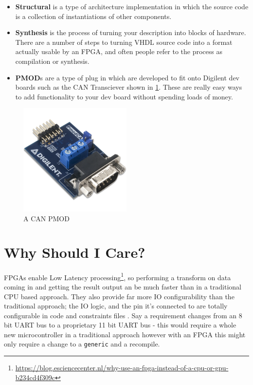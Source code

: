 \documentclass[11pt,a4paper]{article}
\newlength\myheight
\newlength\mydepth
\newcommand*\inlinegraphics[1]{%
  \settototalheight\myheight{Xygp}%
  \settodepth\mydepth{Xygp}%
  \raisebox{-\mydepth}{\texttt{[image: \#1]}}%
}
\newcommand{\handwaving}{\inlinegraphics{./src/hand.png}}
\begin{document}
\begin{itemize}
    \item \textbf{Structural} is a type of architecture implementation in which the source code is a collection of instantiations of other components. 
    \item \textbf{Synthesis} is the process of turning your description into blocks of hardware.\handwaving There are a number of steps to turning VHDL source code into a format actually usable by an FPGA, and often people refer to the process as compilation or synthesis. 
    \item \textbf{PMOD}s are a type of plug in which are developed to fit onto Digilent dev boards such as the CAN Transciever shown in \cref{fig:pmod}. These are really easy ways to add functionality to your dev board without spending loads of money.
\end{itemize}

\begin{figure}[H]
    \begin{center}
        \includegraphics[width=0.5\textwidth]{./src/pmod_can.png}
        \caption{A CAN PMOD}
        \label{fig:pmod}
    \end{center}
\end{figure}
\pagebreak
\tableofcontents
\listoffigures
\listoftables
\pagebreak

\setlength{\parskip}{\medskipamount}

\section{Why Should I Care?}
FPGAs enable Low Latency processing\footnote{\url{https://blog.esciencecenter.nl/why-use-an-fpga-instead-of-a-cpu-or-gpu-b234cd4f309c}}, so performing a transform on data coming in and getting the result output an be much faster than in a traditional CPU based approach. They also provide far more IO configurability than the traditional approach; the IO logic, and the pin it's connected to are totally configurable in code and constraints files\handwaving. Say a requirement changes from an 8 bit UART bus to a proprietary 11 bit UART bus - this would require a whole new microcontroller in a traditional approach however with an FPGA this might only require a change to a \texttt{generic} and a recompile. 
\end{document}
